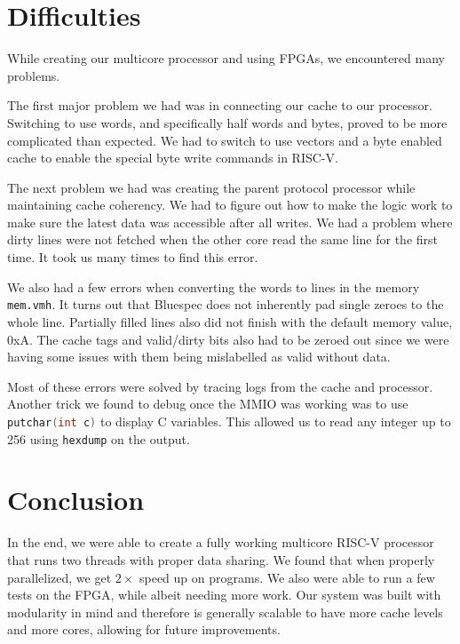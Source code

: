 \documentclass{article}
\begin{document}
\section{Difficulties}
 
While creating our multicore processor and using FPGAs, we encountered many problems. 

The first major problem we had was in connecting our cache to our processor. Switching to use words, and specifically half words and bytes, proved to be more complicated than expected. We had to switch to use vectors and a byte enabled cache to enable the special byte write commands in RISC-V.

The next problem we had was creating the parent protocol processor while maintaining cache coherency. We had to figure out how to make the logic work to make sure the latest data was accessible after all writes. We had a problem where dirty lines were not fetched when the other core read the same line for the first time. It took us many times to find this error.

We also had a few errors when converting the words to lines in the memory \lstinline{mem.vmh}. It turns out that Bluespec does not inherently pad single zeroes to the whole line. Partially filled lines also did not finish with the default memory value, 0xA. The cache tags and valid/dirty bits also had to be zeroed out since we were having some issues with them being mislabelled as valid without data. 

Most of these errors were solved by tracing logs from the cache and processor. Another trick we found to debug once the MMIO was working was to use \lstinline[language=C]|putchar(int c)| to display C variables. This allowed us to read any integer up to 256 using \lstinline|hexdump| on the output. 

\section{Conclusion}

In the end, we were able to create a fully working multicore RISC-V processor that runs two threads with proper data sharing. We found that when properly parallelized, we get $2\times$ speed up on programs. We also were able to run a few tests on the FPGA, while albeit needing more work. Our system was built with modularity in mind and therefore is generally scalable to have more cache levels and more cores, allowing for future improvements.
\end{document}
